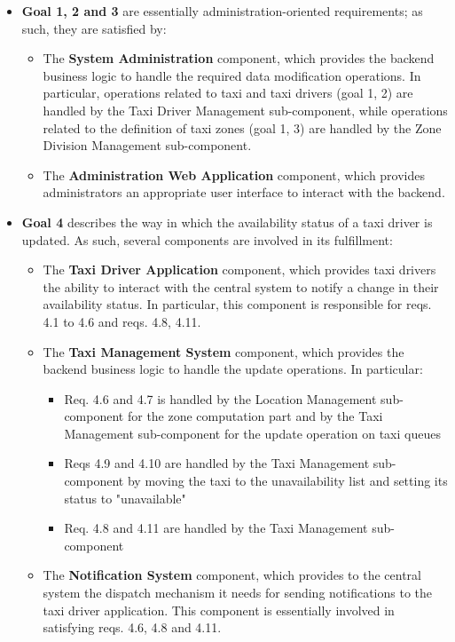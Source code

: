 \begin{itemize}
	\item \textbf{Goal 1, 2 and 3} are essentially administration-oriented requirements; as such, they are satisfied by:
	\begin{itemize}
	\item The \textbf{System Administration} component, which provides the backend business logic to handle the required data modification operations. In particular, operations related to taxi and taxi drivers (goal 1, 2) are handled by the Taxi Driver Management sub-component, while operations related to the definition of taxi zones (goal 1, 3) are handled by the Zone Division Management sub-component.
	\item The \textbf{Administration Web Application} component, which provides administrators an appropriate user interface to interact with the backend.
	\end{itemize}
	\item \textbf{Goal 4} describes the way in which the availability status of a taxi driver is updated. As such, several components are involved in its fulfillment:
	\begin{itemize}
	\item The \textbf{Taxi Driver Application} component, which provides taxi drivers the ability to interact with the central system to notify a change in their availability status. In particular, this component is responsible for reqs. 4.1 to 4.6 and reqs. 4.8, 4.11.
	\item The \textbf{Taxi Management System} component, which provides the backend business logic to handle the update operations. In particular:
	\begin{itemize}
	\item Req. 4.6 and 4.7 is handled by the Location Management sub-component for the zone computation part and by the Taxi Management sub-component for the update operation on taxi queues
	\item Reqs 4.9 and 4.10 are handled by the Taxi Management sub-component by moving the taxi to the unavailability list and setting its status to "unavailable"
	\item Req. 4.8 and 4.11 are handled by the Taxi Management sub-component
	\end{itemize}
	\item The \textbf{Notification System} component, which provides to the central system the dispatch mechanism it needs for sending notifications to the taxi driver application. This component is essentially involved in satisfying reqs. 4.6, 4.8 and 4.11.

\end{itemize}
\end{itemize}
